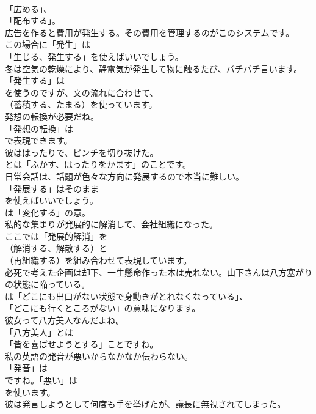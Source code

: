 \documentclass[8pt]{extreport}
\begin{document}
\begin{CJK}{UTF8}{min}
\\	「広める」、
\\	「配布する」。	
\\	広告を作ると費用が発生する。その費用を管理するのがこのシステムです。 
\\	この場合に「発生」は
\\	「生じる、発生する」を使えばいいでしょう。	
\\	冬は空気の乾燥により、静電気が発生して物に触るたび、バチバチ言います。 
\\	「発生する」は
\\	を使うのですが、文の流れに合わせて、
\\	（蓄積する、たまる）を使っています。	
\\	発想の転換が必要だね。 
\\	「発想の転換」は
\\	で表現できます。	
\\	彼ははったりで、ピンチを切り抜けた。 
\\	とは「ふかす、はったりをかます」のことです。	
\\	日常会話は、話題が色々な方向に発展するので本当に難しい。 
\\	「発展する」はそのまま 
\\	を使えばいいでしょう。
\\	は「変化する」の意。	
\\	私的な集まりが発展的に解消して、会社組織になった。 
\\	ここでは「発展的解消」を
\\	（解消する、解散する）と
\\	（再組織する）を組み合わせて表現しています。	
\\	必死で考えた企画は却下、一生懸命作った本は売れない。山下さんは八方塞がりの状態に陥っている。 
\\	は「どこにも出口がない状態で身動きがとれなくなっている」、
\\	「どこにも行くところがない」の意味になります。	
\\	彼女って八方美人なんだよね。 
\\	「八方美人」とは
\\	「皆を喜ばせようとする」ことですね。	
\\	私の英語の発音が悪いからなかなか伝わらない。 
\\	「発音」は
\\	ですね。「悪い」は
\\	を使います。	
\\	彼は発言しようとして何度も手を挙げたが、議長に無視されてしまった。 

\end{CJK}
\end{document}
